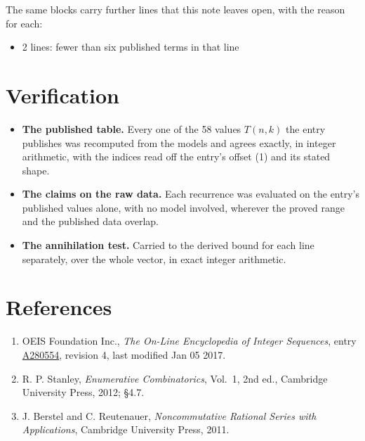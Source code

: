 \documentclass[11pt]{article}
\theoremstyle{definition}
\begin{document}
The same blocks carry further lines that this note leaves open, with the reason for each:

\begin{itemize}

\item 2 lines: fewer than six published terms in that line

\end{itemize}

\section{Verification}

\begin{itemize}

\item {\bfseries The published table.} Every one of the 58 values $T(n,k)$ the entry publishes was recomputed from the models and agrees exactly, in integer arithmetic, with the indices read off the entry's offset (1) and its stated shape.

\item {\bfseries The claims on the raw data.} Each recurrence was evaluated on the entry's published values alone, with no model involved, wherever the proved range and the published data overlap.

\item {\bfseries The annihilation test.} Carried to the derived bound for each line separately, over the whole vector, in exact integer arithmetic.

\end{itemize}

\section{References}

\begin{enumerate}

\item OEIS Foundation Inc., \emph{The On-Line Encyclopedia of Integer Sequences}, entry \href{https://oeis.org/A280554}{A280554}, revision 4, last modified Jan 05 2017.

\item R. P. Stanley, \emph{Enumerative Combinatorics}, Vol.~1, 2nd ed., Cambridge University Press, 2012; \S4.7.

\item J. Berstel and C. Reutenauer, \emph{Noncommutative Rational Series with Applications}, Cambridge University Press, 2011.

\end{enumerate}
\end{document}
